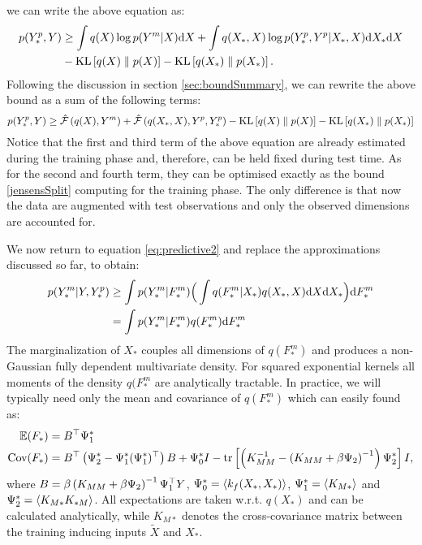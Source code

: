 we can write the above equation as:
\begin{align}
p(Y_*^p, Y) & \geq  \int q(X) \log p(Y^m | X) \text{d}  X 
    +  \int q(X_*,X) \log p(Y_*^p, Y^p|X_*, X) \text{d}  X_* \text{d}  X  \nonumber \\
& - \text{KL} \left[ q(X) \parallel p(X) \right] - \text{KL} \left[ q(X_*) \parallel p(X_*) \right]. \label{eq:predictiveMissing1b}
\end{align}  
Following the discussion in section \ref{sec:boundSummary}, we can rewrite the above bound as
a sum of the following terms:
\begin{equation}
\label{eq:predictiveMissing2}
p(Y_*^p, Y) \geq \hat{\mathcal{F}}\left( q(X),Y^m \right) + \hat{\mathcal{F}}\left(q(X_*,X),Y^p, Y^p_* \right)
- \text{KL} \left[ q(X) \parallel p(X) \right] - \text{KL} \left[ q(X_*) \parallel p(X_*) \right]
\end{equation}
Notice that the first and third term of the above equation are
already estimated during the training phase and, therefore, can be held fixed
during test time. As for the second and fourth term, they can be optimised exactly
as the bound \eqref{jensensSplit} computing for the training phase. The only difference
is that now the data are augmented with test observations and only the observed
dimensions are accounted for.

We now return to equation \eqref{eq:predictive2} and replace the approximations
discussed so far, to obtain:
\begin{align}
p(Y_*^m | Y, Y_*^p) & \geq \int p(Y_*^m | F_*^m)  \Big( \int q(F_*^m |X_*) q(X_*,X) \text{d} X \text{d} X_* \Big) \text{d} F_*^m  \label{eq:predictive3a} \\
		    & = \int p(Y_*^m | F_*^m)  q(F_*^m) \text{d} F_*^m  \label{eq:predictive3b}
\end{align}
The marginalization of $X_*$
couples all dimensions of $q(F_*^m)$ and produces a non-Gaussian fully dependent
multivariate density.
For squared exponential kernels 
all moments of the density $q(F_*^m$ are analytically tractable. 
In practice, we will typically need only the mean and covariance 
of $q(F_*^m)$ which can easily found as:
\begin{align}
 \mathbb{E}(F_*) ={}&  B^{\top} \Psi_1^* \label{meanFstar} \\
 \text{Cov}(F_*) ={}& B^{\top} \left( \Psi_2^* - \Psi_1^* (\Psi_1^*)^{\top} \right) B + \Psi_0^* I - \text{tr} \left[ \left( K_{MM}^{-1} - \left( K_{MM} + \beta \Psi_2 \right)^{-1} \right) \Psi_2^* \right] I, \label{covFstar}
\end{align}
%
where $B = \beta \left( K_{MM} + \beta \Psi_2 \right)^{-1} \Psi_1^{\top}
Y$, $\Psi_0^* = \left\langle k_f(X_*, X_*) \right\rangle$, $\Psi_1^* = \left\langle K_{M*} \right\rangle$
and $\Psi_2^* = \left\langle K_{M*} K_{*M} \right\rangle$. All expectations are taken
w.r.t. $q(X_*)$ and can be calculated analytically, while $K_{M*}$
denotes the cross-covariance matrix between the training inducing
inputs $\tilde{X}$ and $X_*$. 

